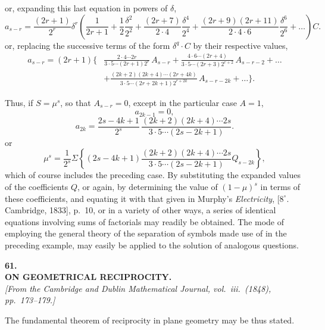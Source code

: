 \documentclass[11pt]{article}
\begin{document}
\noindent or, expanding this last equation in powers of $\delta$,
\[
a_{s-r} =
\frac{(2r+1)}{2^{r}}\delta^{r}
\left(
\frac{1}{2r+1}
+ \frac{1}{2}\frac{\delta^{2}}{2^{2}}
+ \frac{(2r+7)}{2\cdot4}\frac{\delta^{4}}{2^{4}}
+ \frac{(2r+9)(2r+11)}{2\cdot4\cdot6}\frac{\delta^{6}}{2^{6}}
+ \ldots
\right)C. \tag{6}
\]
or, replacing the successive terms of the form $\delta^{q}\cdot C$ by their respective values,
\begin{align*}
a_{s-r} = (2r+1)\biggl\{&
\frac{2\cdot4\cdots2r}{3\cdot5\cdots(2r+1)2^{r}}\,A_{s-r}
+ \frac{4\cdot6\cdots(2r+4)}{3\cdot5\cdots(2r+3)2^{r+2}}\,A_{s-r-2}
+ \ldots\\
&+ \frac{(2k+2)(2k+4)\cdots(2r+4k)}
{3\cdot5\cdots(2r+2k+1)2^{r+2k}}\,A_{s-r-2k}
+ \ldots\biggr\}. \tag{7}
\end{align*}

Thus, if $S = \mu^{s}$, so that $A_{s-r} = 0$, except in the particular case $A = 1$,
\[
a_{2k-1} = 0,
\]
\[
a_{2k} =
\frac{2s-4k+1}{2^{s}}\,
\frac{(2k+2)(2k+4)\cdots2s}{3\cdot5\cdots(2s-2k+1)}. \tag{8}
\]
or
\[
\mu^{s} =
\frac{1}{2^{s}}\Sigma\left\{(2s-4k+1)
\frac{(2k+2)(2k+4)\cdots2s}{3\cdot5\cdots(2s-2k+1)}Q_{s-2k}\right\}, \tag{9}
\]
which of course includes the preceding case. By substituting the expanded values of
the coefficients $Q$, or again, by determining the value of $(1-\mu)^{s}$ in terms of these
coefficients, and equating it with that given in Murphy's \textit{Electricity}, [$8^\circ$. Cambridge, 1833],
p.~10, or in a variety of other ways, a series of identical equations involving sums of
factorials may readily be obtained. The mode of employing the general theory of the
separation of symbols made use of in the preceding example, may easily be applied
to the solution of analogous questions.

\bigskip

\begin{center}
\textbf{\large 61.}\\[0.7em]
\textbf{\large ON GEOMETRICAL RECIPROCITY.}\\[0.5em]
\textit{[From the Cambridge and Dublin Mathematical Journal, vol.~iii.\ (1848), pp.~173--179.]}
\end{center}

\medskip

\noindent The fundamental theorem of reciprocity in plane geometry may be thus stated.
\end{document}
